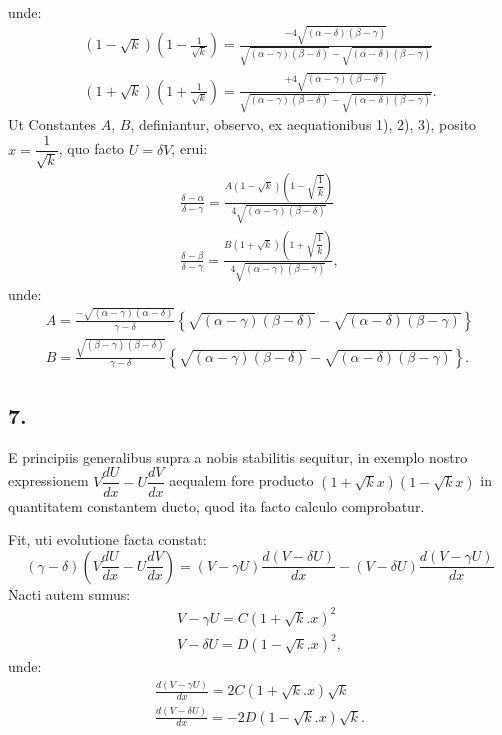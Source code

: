 \documentclass{article}
\begin{document}
unde:
\[
\begin{gathered}
(1-\sqrt{k})\left(1-\frac{1}{\sqrt{k}}\right)=\frac{-4\sqrt{(\alpha-\delta)(\beta-\gamma)}}{\sqrt{(\alpha-\gamma)(\beta-\delta)}-\sqrt{(\alpha-\delta)(\beta-\gamma)}}\\
(1+\sqrt{k})\left(1+\frac{1}{\sqrt{k}}\right)=\frac{+4\sqrt{(\alpha-\gamma)(\beta-\delta)}}{\sqrt{(\alpha-\gamma)(\beta-\delta)}-\sqrt{(\alpha-\delta)(\beta-\gamma)}}.
\end{gathered}
\]
Ut Constantes $A$, $B$, definiantur, observo, ex aequationibus 1), 2), 3), posito $x=\dfrac{1}{\sqrt{k}}$, quo facto $U=\delta V$, erui:
\[
\begin{gathered}
\frac{\delta-\alpha}{\delta-\gamma}=\frac{A(1-\sqrt{k})\left(1-\sqrt{\dfrac{1}{k}}\right)}{4\sqrt{(\alpha-\gamma)(\beta-\delta)}}\\
\frac{\delta-\beta}{\delta-\gamma}=\frac{B(1+\sqrt{k})\left(1+\sqrt{\dfrac{1}{k}}\right)}{4\sqrt{(\alpha-\gamma)(\beta-\gamma)}},
\end{gathered}
\]
unde:
\[
\begin{gathered}
A=\frac{-\sqrt{(\alpha-\gamma)(\alpha-\delta)}}{\gamma-\delta}\left\{\sqrt{(\alpha-\gamma)(\beta-\delta)}-\sqrt{(\alpha-\delta)(\beta-\gamma)}\right\}\\
B=\frac{\sqrt{(\beta-\gamma)(\beta-\delta)}}{\gamma-\delta}\left\{\sqrt{(\alpha-\gamma)(\beta-\delta)}-\sqrt{(\alpha-\delta)(\beta-\gamma)}\right\}.
\end{gathered}
\]

\subsection*{7.}

E principiis generalibus supra a nobis stabilitis sequitur, in exemplo nostro expressionem $V\dfrac{dU}{dx}-U\dfrac{dV}{dx}$ aequalem fore producto $(1+\sqrt{k}x)(1-\sqrt{k}x)$ in quantitatem constantem ducto, quod ita facto calculo comprobatur.

Fit, uti evolutione facta constat:
\[
(\gamma-\delta)\left(V\frac{dU}{dx}-U\frac{dV}{dx}\right)=(V-\gamma U)\frac{d(V-\delta U)}{dx}-(V-\delta U)\frac{d(V-\gamma U)}{dx}
\]
Nacti autem sumus:
\[
\begin{gathered}
V-\gamma U=C(1+\sqrt{k}.x)^{2}\\
V-\delta U=D(1-\sqrt{k}.x)^{2},
\end{gathered}
\]
unde:
\[
\begin{gathered}
\frac{d(V-\gamma U)}{dx}=2C(1+\sqrt{k}.x)\sqrt{k}\\
\frac{d(V-\delta U)}{dx}=-2D(1-\sqrt{k}.x)\sqrt{k}.
\end{gathered}
\]
\end{document}
